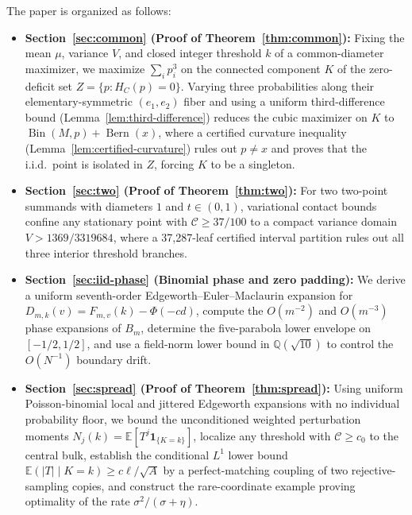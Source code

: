 \documentclass[11pt]{article}
\numberwithin{equation}{section}
\theoremstyle{remark}
\DeclareMathOperator{\Bern}{Bern}
\DeclareMathOperator{\Bin}{Bin}
\newcommand{\E}{\mathbb E}
\newcommand{\ind}{\mathbf1}
\begin{document}
The paper is organized as follows:
\begin{itemize}[leftmargin=2em]
\item \textbf{Section~\ref{sec:common} (Proof of Theorem~\ref{thm:common}):}
Fixing the mean $\mu$, variance $V$, and closed integer threshold $k$ of a
common-diameter maximizer, we maximize $\sum_ip_i^3$ on the connected
component $K$ of the zero-deficit set $Z=\{p:H_C(p)=0\}$. Varying three
probabilities along their elementary-symmetric $(e_1,e_2)$ fiber and using a
uniform third-difference bound (Lemma~\ref{lem:third-difference}) reduces the
cubic maximizer on $K$ to $\Bin(M,p)+\Bern(x)$, where a certified curvature
inequality (Lemma~\ref{lem:certified-curvature}) rules out $p\ne x$ and proves
that the i.i.d.\ point is isolated in $Z$, forcing $K$ to be a singleton.
\item \textbf{Section~\ref{sec:two} (Proof of Theorem~\ref{thm:two}):}
For two two-point summands with diameters $1$ and $t\in(0,1)$, variational
contact bounds confine any stationary point with $\mathcal C\ge37/100$ to a
compact variance domain $V>1369/3319684$, where a 37,287-leaf certified
interval partition rules out all three interior threshold branches.
\item \textbf{Section~\ref{sec:iid-phase} (Binomial phase and zero padding):}
We derive a uniform seventh-order Edgeworth--Euler--Maclaurin expansion for
$D_{m,k}(v)=F_{m,v}(k)-\Phi(-cd)$, compute the $O(m^{-2})$ and $O(m^{-3})$
phase expansions of $B_m$, determine the five-parabola lower envelope on
$[-1/2,1/2]$, and use a field-norm lower bound in $\mathbb Q(\sqrt{10})$ to
control the $O(N^{-1})$ boundary drift.
\item \textbf{Section~\ref{sec:spread} (Proof of Theorem~\ref{thm:spread}):}
Using uniform Poisson-binomial local and jittered Edgeworth expansions with
no individual probability floor, we bound the unconditioned weighted
perturbation moments $N_j(k)=\E[T^j\ind_{\{K=k\}}]$, localize any threshold
with $\mathcal C\ge c_0$ to the central bulk, establish the conditional $L^1$
lower bound $\E(|T|\mid K=k)\ge c\ell/\sqrt A$ by a perfect-matching coupling
of two rejective-sampling copies, and construct the rare-coordinate example
proving optimality of the rate $\sigma^2/(\sigma+\eta)$.
\end{itemize}







\end{document}
